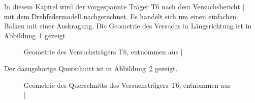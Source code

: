 \documentclass[
  11pt,
  letterpaper,
]{scrreprt}
\begin{document}
In diesem Kapitel wird der vorgespannte Träger T6 nach dem
Versuchsbericht {[}\citeproc{ref-sigrist_versuche_1993}{5}{]} mit dem
Drehfedermodell nachgerechnet. Es handelt sich um einen einfachen Balken
mit einer Auskragung. Die Geometrie des Versuchs in Längsrichtung ist in
Abbildung~\ref{fig-geometrie_t6} gezeigt.

\begin{figure}[H]


\caption{\label{fig-geometrie_t6}Geometrie des Versuchsträgers T6,
entnommen aus {[}\citeproc{ref-sigrist_versuche_1993}{5}{]}}

\end{figure}%

Der dazugehörige Querschnitt ist in Abbildung~\ref{fig-geometrie_qs_t6}
gezeigt.

\begin{figure}[H]


\caption{\label{fig-geometrie_qs_t6}Geometrie des Querschnitts des
Versuchsträgers T6, entnommen aus
{[}\citeproc{ref-sigrist_versuche_1993}{5}{]}}

\end{figure}%
\end{document}
